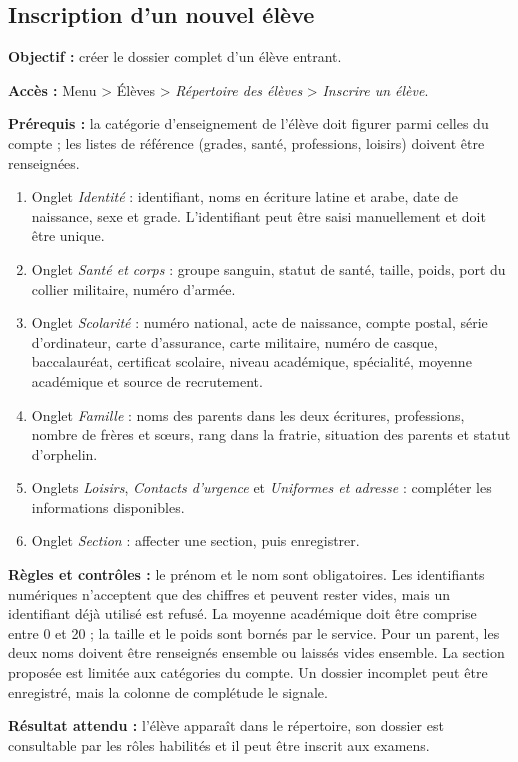 \subsection{Inscription d'un nouvel élève}
\textbf{Objectif :} créer le dossier complet d'un élève entrant.\par
\textbf{Accès :} Menu > Élèves > \emph{Répertoire des élèves} > \emph{Inscrire un élève}.\par
\textbf{Prérequis :} la catégorie d'enseignement de l'élève doit figurer parmi celles du compte ; les
listes de référence (grades, santé, professions, loisirs) doivent être renseignées.\par
\begin{enumerate}
    \item Onglet \emph{Identité} : identifiant, noms en écriture latine et arabe, date de naissance,
          sexe et grade. L'identifiant peut être saisi manuellement et doit être unique.
    \item Onglet \emph{Santé et corps} : groupe sanguin, statut de santé, taille, poids, port du
          collier militaire, numéro d'armée.
    \item Onglet \emph{Scolarité} : numéro national, acte de naissance, compte postal, série
          d'ordinateur, carte d'assurance, carte militaire, numéro de casque, baccalauréat, certificat
          scolaire, niveau académique, spécialité, moyenne académique et source de recrutement.
    \item Onglet \emph{Famille} : noms des parents dans les deux écritures, professions, nombre de
          frères et s\oe{}urs, rang dans la fratrie, situation des parents et statut d'orphelin.
    \item Onglets \emph{Loisirs}, \emph{Contacts d'urgence} et \emph{Uniformes et adresse} : compléter
          les informations disponibles.
    \item Onglet \emph{Section} : affecter une section, puis enregistrer.
\end{enumerate}
\textbf{Règles et contrôles :} le prénom et le nom sont obligatoires. Les identifiants numériques
n'acceptent que des chiffres et peuvent rester vides, mais un identifiant déjà utilisé est refusé. La
moyenne académique doit être comprise entre 0 et 20 ; la taille et le poids sont bornés par le service.
Pour un parent, les deux noms doivent être renseignés ensemble ou laissés vides ensemble. La section
proposée est limitée aux catégories du compte. Un dossier incomplet peut être enregistré, mais la
colonne de complétude le signale.\par
\textbf{Résultat attendu :} l'élève apparaît dans le répertoire, son dossier est consultable par les
rôles habilités et il peut être inscrit aux examens.

